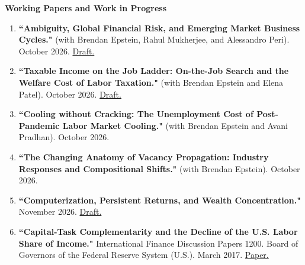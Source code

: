 \documentclass[10pt]{article}
\begin{document}
\textbf{Working Papers and Work in Progress}  \smallskip
\begin{enumerate}
\item \textbf{``Ambiguity, Global Financial Risk, and Emerging Market Business Cycles."} (with Brendan Epstein, Rahul Mukherjee, and Alessandro Peri). October 2026. \href{https://drive.google.com/file/d/1PR014KBkgvjwNrUNhCQ2eIe-FYTlEtoM/view?usp=sharing}{Draft.}

\item \textbf{``Taxable Income on the Job Ladder: On-the-Job Search and the Welfare Cost of Labor Taxation."} (with Brendan Epstein and Elena Patel). October 2026. \href{https://musaorak.com/papers/taxable_income_job_ladder.pdf}{Draft.}

\item \textbf{``Cooling without Cracking: The Unemployment Cost of Post-Pandemic Labor Market Cooling."} (with Brendan Epstein and Avani Pradhan). October 2026.

\item \textbf{``The Changing Anatomy of Vacancy Propagation: Industry Responses and Compositional Shifts."} (with Brendan Epstein). October 2026.

\item \textbf{``Computerization, Persistent Returns, and Wealth Concentration."} November 2026. \href{https://musaorak.com/papers/computerization_wealth_concentration.pdf}{Draft.}

\item \textbf{``Capital-Task Complementarity and the Decline of the U.S. Labor Share of Income."} International Finance Discussion Papers 1200. Board of Governors of the Federal Reserve System (U.S.). March 2017. \href{https://doi.org/10.17016/IFDP.2017.1200}{Paper.}
\end{enumerate}
\medskip



\end{document}
